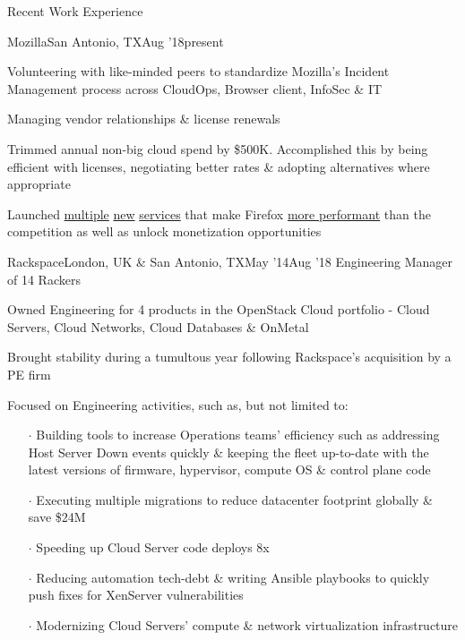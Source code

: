 \documentclass{resume} %
\begin{document}
\begin{rSection}{Recent Work Experience}
\begin{rSubsection}{Mozilla}{San Antonio, TX}{Aug '18}{present}
    \item Volunteering with like-minded peers to standardize Mozilla's Incident Management process across CloudOps, Browser client, InfoSec \& IT
    \item Managing vendor relationships \& license renewals
    \item Trimmed annual non-big cloud spend by \$500K. Accomplished this by being efficient with licenses, negotiating better rates \& adopting alternatives where appropriate
    \item Launched \href{https://vpn.mozilla.org/}{multiple} \href{https://fpn.firefox.com/}{new} \href{https://monitor.firefox.com/}{services} that make Firefox \href{https://blog.mozilla.org/security/2020/01/21/crlite-part-3-speeding-up-secure-browsing/}{more performant} than the competition as well as unlock monetization opportunities
  
\end{rSubsection}


\begin{rSubsection}{Rackspace}{London, UK \& San Antonio, TX}{May '14}{Aug '18}
  {Engineering Manager of 14 Rackers}
  \item Owned Engineering for 4 products in the OpenStack Cloud portfolio - Cloud Servers, Cloud Networks, Cloud Databases \& OnMetal
  \item Brought stability during a tumultous year following Rackspace's acquisition by a PE firm
  \item Focused on Engineering activities, such as, but not limited to:
    \vspace{-0.5em}
    \begin{itemize}  \itemsep0.5pt \parskip0pt
    \item[$\cdot$] Building tools to increase Operations teams' efficiency such as addressing Host Server Down events quickly \& keeping the fleet up-to-date with the latest versions of firmware, hypervisor, compute OS \& control plane code
    \item[$\cdot$] Executing multiple migrations to reduce datacenter footprint globally \& save \$24M
    \item[$\cdot$] Speeding up Cloud Server code deploys 8x
    \item[$\cdot$] Reducing automation tech-debt \& writing Ansible playbooks to quickly push fixes for XenServer vulnerabilities
    \item[$\cdot$] Modernizing Cloud Servers' compute \& network virtualization infrastructure
    \end{itemize}
\end{rSubsection}\vspace{-1em}


\end{rSection}
\end{document}
